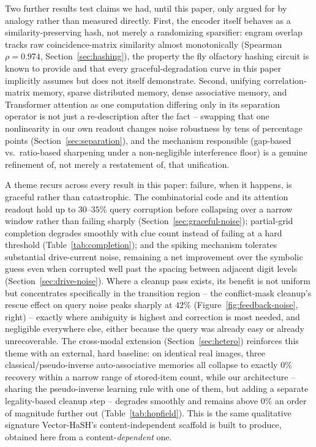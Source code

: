 \documentclass[11pt]{article}
\begin{document}
Two further results test claims we had, until this paper, only argued for by analogy rather
than measured directly. First, the encoder itself behaves as a similarity-preserving hash, not
merely a randomizing sparsifier: engram overlap tracks raw coincidence-matrix similarity almost
monotonically (Spearman $\rho=0.974$, Section~\ref{sec:hashing}), the property the fly
olfactory hashing circuit \cite{dasgupta2017} is known to provide and that every graceful-degradation
curve in this paper implicitly assumes but does not itself demonstrate. Second, unifying
correlation-matrix memory, sparse distributed memory, dense associative memory, and
Transformer attention as one computation differing only in its separation operator
\cite{gershman2025} is not just a re-description after the fact -- swapping that one
nonlinearity in our own readout changes noise robustness by tens of percentage points
(Section~\ref{sec:separation}), and the mechanism responsible (gap-based vs.\ ratio-based
sharpening under a non-negligible interference floor) is a genuine refinement of, not merely a
restatement of, that unification.

A theme recurs across every result in this paper: failure, when it happens, is graceful
rather than catastrophic. The combinatorial code and its attention readout hold up to
$30$--$35\%$ query corruption before collapsing over a narrow window rather than failing
sharply (Section~\ref{sec:graceful-noise}); partial-grid completion degrades smoothly with
clue count instead of failing at a hard threshold (Table~\ref{tab:completion}); and the
spiking mechanism tolerates substantial drive-current noise, remaining a net improvement over
the symbolic guess even when corrupted well past the spacing between adjacent digit levels
(Section~\ref{sec:drive-noise}). Where a cleanup pass exists, its benefit is not uniform but
concentrates specifically in the transition region -- the conflict-mask cleanup's rescue
effect on query noise peaks sharply at $42\%$ (Figure~\ref{fig:feedback-noise}, right) --
exactly where ambiguity is highest and correction is most needed, and negligible everywhere
else, either because the query was already easy or already unrecoverable. The cross-modal
extension (Section~\ref{sec:hetero}) reinforces this theme with an external, hard baseline:
on identical real images, three classical/pseudo-inverse auto-associative memories all
collapse to exactly $0\%$ recovery within a narrow range of stored-item count, while our
architecture -- sharing the pseudo-inverse learning rule with one of them, but adding a
separate legality-based cleanup step -- degrades smoothly and remains above $0\%$ an order of
magnitude further out (Table~\ref{tab:hopfield}). This is the same qualitative signature
Vector-HaSH's content-independent scaffold is built to produce, obtained here from a
content-\emph{dependent} one.
\end{document}

